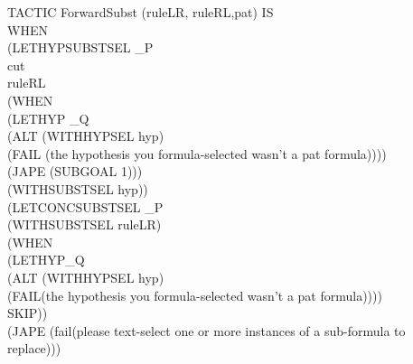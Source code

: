 \begin{japeish}
TACTIC ForwardSubst (ruleLR, ruleRL,pat) IS\\
\tab WHEN \\
\tab \tab (LETHYPSUBSTSEL \_P \\
\tab \tab \tab cut\\
\tab \tab \tab ruleRL \\
\tab \tab \tab (WHEN \\
\tab \tab \tab \tab (LETHYP \_Q \\
\tab \tab \tab \tab \tab (ALT (WITHHYPSEL hyp) \\
\tab \tab \tab \tab \tab \tab (FAIL (the hypothesis you formula-selected wasn't a pat formula))))\\
\tab \tab \tab \tab (JAPE (SUBGOAL 1))) \\
\tab \tab \tab (WITHSUBSTSEL hyp))\\
\tab \tab (LETCONCSUBSTSEL \_P\\
\tab \tab \tab (WITHSUBSTSEL ruleLR)\\
\tab \tab \tab (WHEN \\
\tab \tab \tab \tab (LETHYP\_Q \\
\tab \tab \tab \tab \tab (ALT (WITHHYPSEL hyp) \\
\tab \tab \tab \tab \tab \tab (FAIL(the hypothesis you formula-selected wasn't a pat formula))))\\
\tab \tab \tab \tab SKIP))\\
\tab \tab (JAPE (fail(please text-select one or more instances of a sub-formula to replace)))
\end{japeish}

